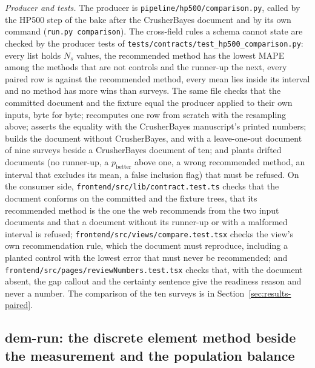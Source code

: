 \emph{Producer and tests.} The producer is \texttt{pipeline/\allowbreak{}hp500/\allowbreak{}comparison.py}, called by the HP500 step of the bake
after the CrusherBayes document and by its own command (\texttt{run.py comparison}). The cross-field rules a schema cannot
state are checked by the producer tests of \texttt{tests/\allowbreak{}contracts/\allowbreak{}test\_hp500\_comparison.py}: every list holds
$N_s$ values, the recommended method has the lowest MAPE among the methods that are not controls and the runner-up the next,
every paired row is against the recommended method, every mean lies inside its interval and no method has more wins than
surveys. The same file checks that the committed document and the fixture equal the producer applied to their own inputs, byte
for byte; recomputes one row from scratch with the resampling above; asserts the equality with the CrusherBayes manuscript's
printed numbers; builds the document without CrusherBayes, and with a leave-one-out document of nine surveys beside a CrusherBayes
document of ten; and plants drifted documents (no runner-up, a $p_{\mathrm{better}}$ above one, a wrong recommended method, an
interval that excludes its mean, a false inclusion flag) that must be refused. On the consumer side,
\texttt{frontend/\allowbreak{}src/\allowbreak{}lib/\allowbreak{}contract.test.ts} checks that the document conforms on the committed and the fixture trees,
that its recommended method is the one the web recommends from the two input documents and that a document without its runner-up
or with a malformed interval is refused; \texttt{frontend/\allowbreak{}src/\allowbreak{}views/\allowbreak{}compare.test.tsx} checks the view's own
recommendation rule, which the document must reproduce, including a planted control with the lowest error that must never be
recommended; and \texttt{frontend/\allowbreak{}src/\allowbreak{}pages/\allowbreak{}reviewNumbers.test.tsx} checks that, with the document absent, the gap
callout and the certainty sentence give the readiness reason and never a number. The comparison of the ten surveys is in
Section~\ref{sec:results-paired}.

\subsection{dem-run: the discrete element method beside the measurement and the population balance}\label{sec:data-dem}

